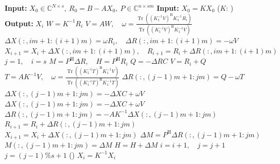 \begin{algorithm}[H]\caption{}\label{alg:preconditioned-block-idr}\begin{algorithmic}[1]
\Statex\textbf{Input:} $X_0\in\mathbb C^{N\times s},\ R_0=B-AX_0,\ P\in\mathbb C^{n\times sm}$
\Statex\textbf{Input:} $X_0=KX_0$ ($K$: )
\Statex\textbf{Output:} $X_i$
\State $W=K^{-1}R_i$
\State $V=AW,\quad\omega=\frac{\operatorname{Tr}((K_1^{-1}V)^{\mathrm H}K_1^{-1}R_i)}{\operatorname{Tr}((K_1^{-1}V)^{\mathrm H}K_1^{-1}V)}$
\State $\Delta X(:,im+1:(i+1)m)=\omega R_i,\quad\Delta R(:,im+1:(i+1)m)=-\omega V$
\State $X_{i+1}=X_i+\Delta X(:,im+1:(i+1)m),\quad R_{i+1}=R_i+\Delta R(:,im+1:(i+1)m)$
\EndFor
\State $j=1,\quad i=s$
\State $M=P^{\mathrm H}\Delta R,\quad H=P^{\mathrm H}R_i$
\State{}
\State $Q=-\Delta RC$
\State $V=R_i+Q$
\State $T=AK^{-1}V,\quad\omega=\frac{\operatorname{Tr}((K_1^{-1}T)^{\mathrm H}K_1^{-1}V)}{\operatorname{Tr}((K_1^{-1}T)^{\mathrm H}K_1^{-1}T)}$
\State $\Delta R(:,(j-1)m+1:jm)=Q-\omega T$
\State $\Delta X(:,(j-1)m+1:jm)=-\Delta XC+\omega V$
\Else
\State $\Delta X(:,(j-1)m+1:jm)=-\Delta XC+\omega V$
\State $\Delta R(:,(j-1)m+1:jm)=-AK^{-1}\Delta X(:,(j-1)m+1:jm)$
\EndIf
\State $R_{i+1}=R_i+\Delta R(:,(j-1)m+1:jm)$
\State $X_{i+1}=X_i+\Delta X(:,(j-1)m+1:jm)$
\State $\Delta M=P^{\mathrm H}\Delta R(:,(j-1)m+1:jm)$
\State $M(:,(j-1)m+1:jm)=\Delta M$
\State $H=H+\Delta M$
\State $i=i+1,\quad j=j+1$
\State $j=(j-1)\%s+1$ ()
\EndFor\EndWhile
\State $X_i=K^{-1}X_i$
\end{algorithmic}\end{algorithm}
